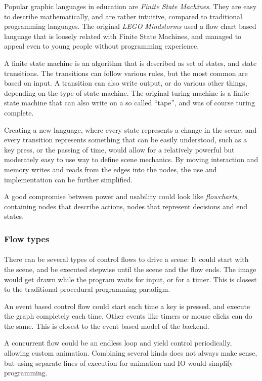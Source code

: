 Popular graphic languages in education are \textit{Finite State Machines}\cite{fsm}. They are easy to describe mathematically, and are rather intuitive, compared to traditional programming languages.
The original \textit{LEGO} \textit{Mindstorms} used a flow chart based language that is loosely related with Finite State Machines, and managed to appeal even to young people without programming experience.

A finite state machine is an algorithm that is described as set of states, and state transitions. The transitions can follow various rules, but the most common are based on input. A transition can also write output, or do various other things, depending on the type of state machine.
The original turing machine is a finite state machine that can also write on a so called ``tape'', and was of course turing complete.

Creating a new language, where every state represents a change in the scene, and every transition represents something that can be easily understood, such as a key press, or the passing of time, would allow for a relatively powerful but moderately easy to use way to define scene mechanics.
By moving interaction and memory writes and reads from the edges into the nodes, the use and implementation can be further simplified.

A good compromise between power and usability could look like \textit{flowcharts}, containing nodes that describe actions, nodes that represent decisions and end states.

\subsubsection{Flow types}
\paragraph{}
There can be several types of control flows to drive a scene:
It could start with the scene, and be executed stepwise until the scene and the flow ends.
The image would get drawn while the program waits for input, or for a timer.
This is closest to the traditional procedural programming paradigm.

An event based control flow could start each time a key is pressed, and execute the graph completely each time.
Other events like timers or mouse clicks can do the same.
This is closest to the event based model of the backend.

A concurrent flow could be an endless loop and yield control periodically, allowing custom animation.
Combining several kinds does not always make sense, but using separate lines of execution for animation and IO would simplify programming.

